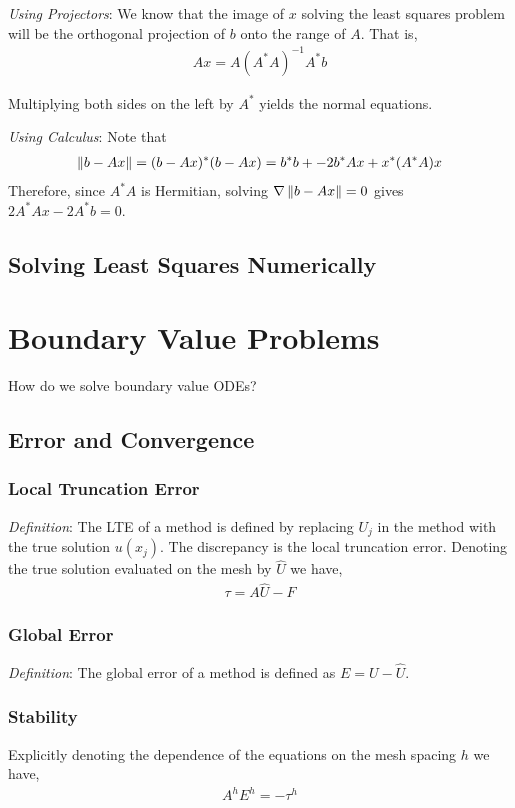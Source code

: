 \documentclass[12pt]{article}
\begin{document}
\textit{Using Projectors}:
We know that the image of \( x \) solving the least squares problem will be the orthogonal projection of \( b \) onto the range of \( A \). That is,
\begin{align*}
    Ax = A(A^*A)^{-1}A^*b
\end{align*}

Multiplying both sides on the left by \( A^* \) yields the normal equations.

\textit{Using Calculus}:
Note that
\begin{align*}
    \left\lVert b-Ax\right\rVert = (b-Ax)^*(b-Ax) = b^*b + -2b^*Ax + x^*(A^*A)x
\end{align*}
Therefore, since \( A^*A \) is Hermitian, solving \( \nabla \left\lVert b-Ax\right\rVert = 0 \) gives \( 2A^*Ax - 2A^*b = 0 \).


\subsection{Solving Least Squares Numerically}

\pagebreak
\section{Boundary Value Problems}
How do we solve boundary value ODEs?

\subsection{Error and Convergence}

\subsubsection{Local Truncation Error}
\textit{Definition}: The LTE of a method is defined by replacing \( U_j \) in the method with the true solution \( u(x_j) \). The discrepancy is the local truncation error. Denoting the true solution evaluated on the mesh by \( \hat{U} \) we have,
\begin{align*}
    \tau = A \hat{U} - F
\end{align*}


\subsubsection{Global Error}
\textit{Definition}: The global error of a method is defined as \( E = U - \hat{U} \).

\subsubsection{Stability}
Explicitly denoting the dependence of the equations on the mesh spacing \( h \) we have,
\begin{align*}
    A^hE^h = -\tau^h
\end{align*}
\end{document}
